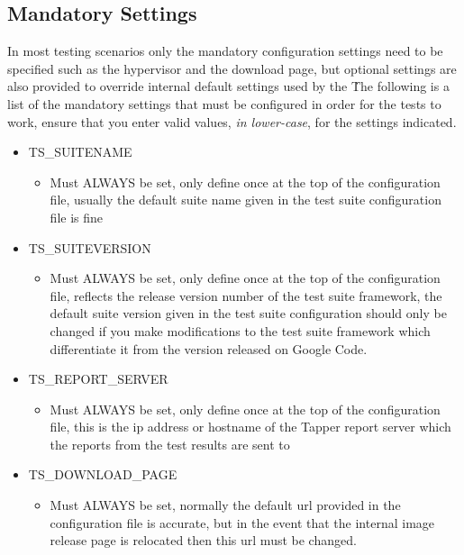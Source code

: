 \subsection{Mandatory Settings}
\label{sct:mandatorysettings}

In most testing scenarios only the mandatory configuration settings need to be specified such as the hypervisor and 
the download page, but optional settings are also provided to override internal default settings used by the 
\cernvmtestframework\. The following is a list of the mandatory settings that must be configured in order for the
tests to work, ensure that you enter valid values, \emph{in lower-case}, for the settings indicated.




\begin{itemize}
\item	TS\_SUITENAME
		\begin{itemize}
		\item	Must ALWAYS be set, only define once at the top of the configuration file, 
	  		  	usually the default suite name given in the test suite configuration file is fine
		\end{itemize}
	  		  
\item	TS\_SUITEVERSION
		\begin{itemize}
		\item	Must ALWAYS be set, only define once at the top of the configuration file,
	  		  	reflects the release version number of the test suite framework, the default 
      		  	suite version given in the test suite configuration should only be changed if 
     		  	you make modifications to the test suite framework which differentiate it from
      		  	the version released on Google Code.
		\end{itemize}

\item	TS\_REPORT\_SERVER
		\begin{itemize}
		\item	Must ALWAYS be set, only define once at the top of the configuration file,
      			this is the ip address or hostname of the Tapper report server which the reports
      			from the test results are sent to
		\end{itemize}
		
\item	TS\_DOWNLOAD\_PAGE
		\begin{itemize}
		\item	Must ALWAYS be set, normally the default url provided in the configuration file is
				accurate, but in the event that the internal \cernvm image release page is relocated
				then this url must be changed.
		\end{itemize}


\end{itemize}
